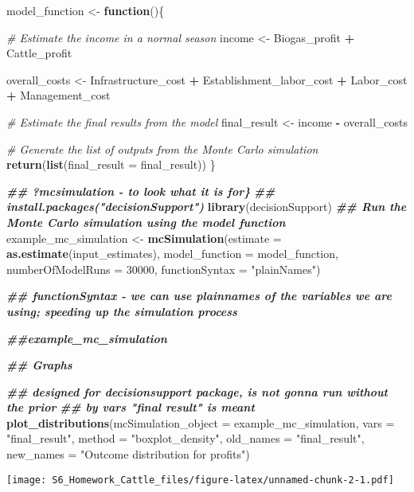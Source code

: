 \documentclass[
]{article}
\newenvironment{Shaded}{\begin{snugshade}}{\end{snugshade}}
\newcommand{\AttributeTok}[1]{\textcolor[rgb]{0.13,0.29,0.53}{#1}}
\newcommand{\CommentTok}[1]{\textcolor[rgb]{0.56,0.35,0.01}{\textit{#1}}}
\newcommand{\ControlFlowTok}[1]{\textcolor[rgb]{0.13,0.29,0.53}{\textbf{#1}}}
\newcommand{\DecValTok}[1]{\textcolor[rgb]{0.00,0.00,0.81}{#1}}
\newcommand{\DocumentationTok}[1]{\textcolor[rgb]{0.56,0.35,0.01}{\textbf{\textit{#1}}}}
\newcommand{\FunctionTok}[1]{\textcolor[rgb]{0.13,0.29,0.53}{\textbf{#1}}}
\newcommand{\NormalTok}[1]{#1}
\newcommand{\OtherTok}[1]{\textcolor[rgb]{0.56,0.35,0.01}{#1}}
\newcommand{\SpecialCharTok}[1]{\textcolor[rgb]{0.81,0.36,0.00}{\textbf{#1}}}
\newcommand{\StringTok}[1]{\textcolor[rgb]{0.31,0.60,0.02}{#1}}
\begin{document}
\begin{Shaded}
\begin{Highlighting}[]
\NormalTok{model\_function }\OtherTok{\textless{}{-}} \ControlFlowTok{function}\NormalTok{()\{}
  
  \CommentTok{\# Estimate the income in a normal season}
\NormalTok{  income }\OtherTok{\textless{}{-}}\NormalTok{ Biogas\_profit }\SpecialCharTok{+}\NormalTok{ Cattle\_profit}
  
\NormalTok{  overall\_costs }\OtherTok{\textless{}{-}}\NormalTok{ Infrastructure\_cost }\SpecialCharTok{+}\NormalTok{ Establishment\_labor\_cost }\SpecialCharTok{+}\NormalTok{ Labor\_cost }\SpecialCharTok{+}
\NormalTok{                                           Management\_cost}
  
  \CommentTok{\# Estimate the final results from the model}
\NormalTok{  final\_result }\OtherTok{\textless{}{-}}\NormalTok{ income }\SpecialCharTok{{-}}\NormalTok{ overall\_costs}
  
  \CommentTok{\# Generate the list of outputs from the Monte Carlo simulation}
  \FunctionTok{return}\NormalTok{(}\FunctionTok{list}\NormalTok{(}\AttributeTok{final\_result =}\NormalTok{ final\_result))}
\NormalTok{\}}

\DocumentationTok{\#\# ?mcsimulation {-} to look what it is for\}}
\DocumentationTok{\#\# install.packages("decisionSupport")}
\FunctionTok{library}\NormalTok{(decisionSupport)}
\DocumentationTok{\#\# Run the Monte Carlo simulation using the model function}
\NormalTok{example\_mc\_simulation }\OtherTok{\textless{}{-}} \FunctionTok{mcSimulation}\NormalTok{(}\AttributeTok{estimate =} \FunctionTok{as.estimate}\NormalTok{(input\_estimates),}
                                      \AttributeTok{model\_function =}\NormalTok{ model\_function,}
                                      \AttributeTok{numberOfModelRuns =} \DecValTok{30000}\NormalTok{,}
                                    \AttributeTok{functionSyntax =} \StringTok{"plainNames"}\NormalTok{)}

  \DocumentationTok{\#\# functionSyntax {-} we can use plainnames of the variables we are using; speeding up the simulation process}

  \DocumentationTok{\#\#example\_mc\_simulation}
                                

\DocumentationTok{\#\# Graphs}
\end{Highlighting}
\end{Shaded}

\begin{Shaded}
\begin{Highlighting}[]
\DocumentationTok{\#\# designed for decisionsupport package, is not gonna run without the prior}
\DocumentationTok{\#\# by vars "final result" is meant}
\FunctionTok{plot\_distributions}\NormalTok{(}\AttributeTok{mcSimulation\_object =}\NormalTok{ example\_mc\_simulation,}
                   \AttributeTok{vars =} \StringTok{"final\_result"}\NormalTok{,}
                   \AttributeTok{method =} \StringTok{"boxplot\_density"}\NormalTok{,}
                   \AttributeTok{old\_names =} \StringTok{"final\_result"}\NormalTok{,}
                   \AttributeTok{new\_names =} \StringTok{"Outcome distribution for profits"}\NormalTok{)}
\end{Highlighting}
\end{Shaded}

\texttt{[image: S6\_Homework\_Cattle\_files/figure-latex/unnamed-chunk-2-1.pdf]}
\end{document}
